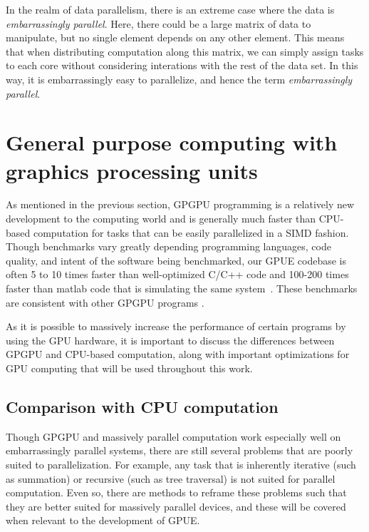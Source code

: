 In the realm of data parallelism, there is an extreme case where the data is \textit{embarrassingly parallel}.
Here, there could be a large matrix of data to manipulate, but no single element depends on any other element.
This means that when distributing computation along this matrix, we can simply assign tasks to each core without considering interations with the rest of the data set.
In this way, it is embarrassingly easy to parallelize, and hence the term \textit{embarrassingly parallel}.

\section{General purpose computing with graphics processing units}


As mentioned in the previous section, GPGPU programming is a relatively new development to the computing world and is generally much faster than CPU-based computation for tasks that can be easily parallelized in a SIMD fashion.
Though benchmarks vary greatly depending programming languages, code quality, and intent of the software being benchmarked, our GPUE codebase is often 5 to 10 times faster than well-optimized C/C++ code and 100-200 times faster than matlab code that is simulating the same system~\cite{wittek2016}.
These benchmarks are consistent with other GPGPU programs .

As it is possible to massively increase the performance of certain programs by using the GPU hardware, it is important to discuss the differences between GPGPU and CPU-based computation, along with important optimizations for GPU computing that will be used throughout this work.

\subsection{Comparison with CPU computation}

Though GPGPU and massively parallel computation work especially well on embarrassingly parallel systems, there are still several problems that are poorly suited to parallelization.
For example, any task that is inherently iterative (such as summation) or recursive (such as tree traversal) is not suited for parallel computation.
Even so, there are methods to reframe these problems such that they are better suited for massively parallel devices, and these will be covered when relevant to the development of GPUE.

